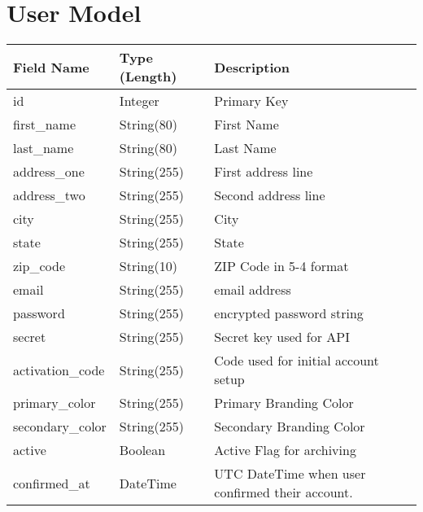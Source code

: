 \documentclass[letterpaper,10pt,english]{sphinxmanual}
\begin{document}
\section{User Model}
\label{dev-models:user-model-label}\label{dev-models:user-model}
\begin{tabulary}{\linewidth}{|L|L|L|}
\hline
\textsf{\relax 
Field Name
} & \textsf{\relax 
Type (Length)
} & \textsf{\relax 
Description
}\\
\hline
id
 & 
Integer
 & 
Primary Key
\\

first\_name
 & 
String(80)
 & 
First Name
\\

last\_name
 & 
String(80)
 & 
Last Name
\\

address\_one
 & 
String(255)
 & 
First address line
\\

address\_two
 & 
String(255)
 & 
Second address line
\\

city
 & 
String(255)
 & 
City
\\

state
 & 
String(255)
 & 
State
\\

zip\_code
 & 
String(10)
 & 
ZIP Code in 5-4 format
\\

email
 & 
String(255)
 & 
email address
\\

password
 & 
String(255)
 & 
encrypted password string
\\

secret
 & 
String(255)
 & 
Secret key used for API
\\

activation\_code
 & 
String(255)
 & 
Code used for initial account setup
\\

primary\_color
 & 
String(255)
 & 
Primary Branding Color
\\

secondary\_color
 & 
String(255)
 & 
Secondary Branding Color
\\

active
 & 
Boolean
 & 
Active Flag for archiving
\\

confirmed\_at
 & 
DateTime
 & 
UTC DateTime when user confirmed
their account.
\\


\end{tabulary}
\end{document}
